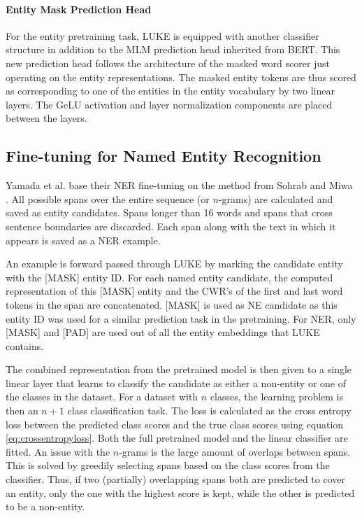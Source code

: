 \documentclass[main.tex]{subfiles}
\begin{document}
\paragraph{Entity Mask Prediction Head}
For the entity pretraining task, LUKE is equipped with another classifier structure in addition to the MLM prediction head inherited from BERT.
This new prediction head follows the architecture of the masked word scorer just operating on the entity representations.
The masked entity tokens are thus scored as corresponding to one of the entities in the entity vocabulary by two linear layers.
The GeLU activation \cite{hendrycks2020gelu} and layer normalization components are placed between the layers.

\subsection{Fine-tuning for Named Entity Recognition}
\label{subsec:fine-tuning-theory}
Yamada et al. base their NER fine-tuning on the method from Sohrab and Miwa \cite{sohrab2018nestedner}.
All possible spans over the entire sequence (or $n$-grams) are calculated and saved as entity candidates.
Spans longer than 16 words and spans that cross sentence boundaries are discarded.
Each span along with the text in which it appears is saved as a NER example.

An example is forward passed through LUKE by marking the candidate entity with the [MASK] entity ID.
For each named entity candidate, the computed representation of this [MASK] entity and the CWR's of the first and last word tokens in the span are concatenated.
[MASK] is used as NE candidate as this entity ID was used for a similar prediction task in the pretraining.
For NER, only [MASK] and [PAD] are used out of all the entity embeddings that LUKE contains.

The combined representation from the pretrained model is then given to a single linear layer that learns to classify the candidate as either a non-entity or one of the classes in the dataset.
For a dataset with $ n $ classes, the learning problem is then an $ n+1 $ class classification task.
The loss is calculated as the cross entropy loss between the predicted class scores and the true class scores using equation \eqref{eq:crossentropyloss}.
Both the full pretrained model and the linear classifier are fitted.
An issue with the $ n $-grams is the large amount of overlaps between spans.
This is solved by greedily selecting spans based on the class scores from the classifier.
Thus, if two (partially) overlapping spans both are predicted to cover an entity, only the one with the highest score is kept, while the other is predicted to be a non-entity.

\end{document}

